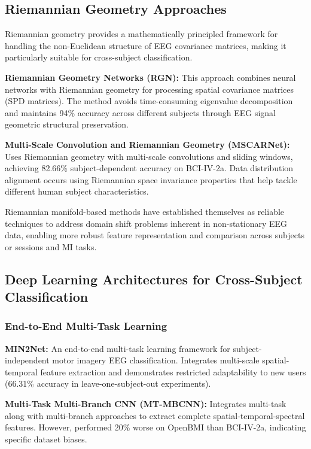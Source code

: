 \documentclass[12pt]{article}
\begin{document}
\subsection{Riemannian Geometry Approaches}

Riemannian geometry provides a mathematically principled framework for handling the non-Euclidean structure of EEG covariance matrices, making it particularly suitable for cross-subject classification.

\textbf{Riemannian Geometry Networks (RGN):} This approach combines neural networks with Riemannian geometry for processing spatial covariance matrices (SPD matrices). The method avoids time-consuming eigenvalue decomposition and maintains 94\% accuracy across different subjects through EEG signal geometric structural preservation.

\textbf{Multi-Scale Convolution and Riemannian Geometry (MSCARNet):} Uses Riemannian geometry with multi-scale convolutions and sliding windows, achieving 82.66\% subject-dependent accuracy on BCI-IV-2a. Data distribution alignment occurs using Riemannian space invariance properties that help tackle different human subject characteristics.

Riemannian manifold-based methods have established themselves as reliable techniques to address domain shift problems inherent in non-stationary EEG data, enabling more robust feature representation and comparison across subjects or sessions and MI tasks.

\subsection{Deep Learning Architectures for Cross-Subject Classification}

\subsubsection{End-to-End Multi-Task Learning}

\textbf{MIN2Net:} An end-to-end multi-task learning framework for subject-independent motor imagery EEG classification. Integrates multi-scale spatial-temporal feature extraction and demonstrates restricted adaptability to new users (66.31\% accuracy in leave-one-subject-out experiments).

\textbf{Multi-Task Multi-Branch CNN (MT-MBCNN):} Integrates multi-task along with multi-branch approaches to extract complete spatial-temporal-spectral features. However, performed 20\% worse on OpenBMI than BCI-IV-2a, indicating specific dataset biases.
\end{document}

